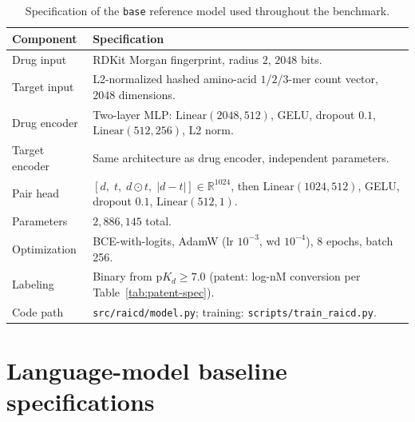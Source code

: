 \documentclass[referee,pdflatex,sn-basic,Numbered]{sn-jnl}
\begin{document}
\begin{appendices}
\begin{table}[t]
  \centering
  \scriptsize
  \caption{Specification of the \texttt{base} reference model used throughout the benchmark.}
  \label{tab:base-spec}
  \setlength{\tabcolsep}{3.5pt}
  \begin{tabular*}{\textwidth}{@{\extracolsep{\fill}}lp{}@{}}
    \toprule
    Component & Specification \\
    \midrule
    Drug input & RDKit Morgan fingerprint, radius $2$, $2048$ bits. \\
    Target input & L2-normalized hashed amino-acid $1$/$2$/$3$-mer count vector, $2048$ dimensions. \\
    Drug encoder & Two-layer MLP: $\mathrm{Linear}(2048,512)$, GELU, dropout $0.1$, $\mathrm{Linear}(512,256)$, L2 norm. \\
    Target encoder & Same architecture as drug encoder, independent parameters. \\
    Pair head & $[d,\; t,\; d \odot t,\; |d-t|] \in \mathbb{R}^{1024}$, then $\mathrm{Linear}(1024,512)$, GELU, dropout $0.1$, $\mathrm{Linear}(512,1)$. \\
    Parameters & $2{,}886{,}145$ total. \\
    Optimization & BCE-with-logits, AdamW (lr $10^{-3}$, wd $10^{-4}$), 8 epochs, batch 256. \\
    Labeling & Binary from $\mathrm{p}K_d \ge 7.0$ (patent: log-nM conversion per Table~\ref{tab:patent-spec}). \\
    Code path & \texttt{src/raicd/model.py}; training: \texttt{scripts/train\_raicd.py}. \\
    \bottomrule
  \end{tabular*}
\end{table}

\section{Language-model baseline specifications}


\end{appendices}
\end{document}
